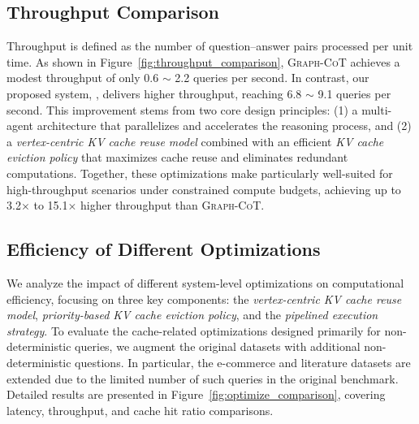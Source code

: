 
\subsection{Throughput Comparison}\label{sec:throughput_comparison}

Throughput is defined as the number of question–answer pairs processed per unit time. As shown in Figure~\ref{fig:throughput_comparison}, \textsc{Graph-CoT} achieves a modest throughput of only 0.6 $\sim$ 2.2 queries per second. In contrast, our proposed system, \projectname, delivers higher throughput, reaching 6.8 $\sim$ 9.1 queries per second. This improvement stems from two core design principles: (1) a multi-agent architecture that parallelizes and accelerates the reasoning process, and (2) a \textit{vertex-centric KV cache reuse model} combined with an efficient \textit{KV cache eviction policy} that maximizes cache reuse and eliminates redundant computations. Together, these optimizations make \projectname particularly well-suited for high-throughput scenarios under constrained compute budgets, achieving up to 3.2$\times$ to 15.1$\times$ higher throughput than \textsc{Graph-CoT}.

\subsection{Efficiency of Different Optimizations}

We analyze the impact of different system-level optimizations on computational efficiency, focusing on three key components: the \textit{vertex-centric KV cache reuse model}, \textit{priority-based KV cache eviction policy}, and the \textit{pipelined execution strategy}. To evaluate the cache-related optimizations designed primarily for non-deterministic queries, we augment the original datasets with additional non-deterministic questions. In particular, the e-commerce and literature datasets are extended due to the limited number of such queries in the original benchmark. Detailed results are presented in Figure~\ref{fig:optimize_comparison}, covering latency, throughput, and cache hit ratio comparisons.

